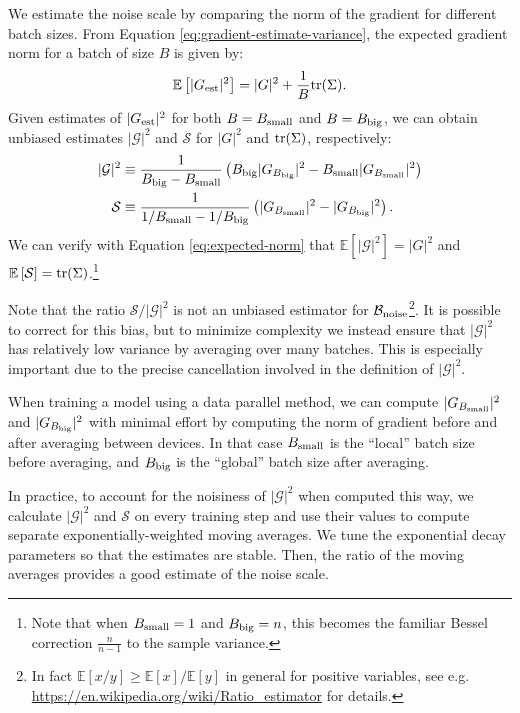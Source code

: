 \documentclass[english]{article}
\begin{document}
We estimate the noise scale by comparing the norm of the gradient for different batch sizes. From Equation \ref{eq:gradient-estimate-variance}, the expected gradient norm for a batch of size $B$ is given by:
\begin{equation}
\mathbb{E}\left[|G_{{\rm est}}|^{2}\right]=|G|^{2}+\frac{1}{B}{\rm tr}(\Sigma).\label{eq:expected-norm}
\end{equation}
Given estimates of $|G_{{\rm est}}|^{2}$ for both $B=B_{{\rm small}}$ and $B=B_{{\rm big}}$, we can obtain unbiased estimates $|\mathcal{G}|^{2}$ and $\mathcal{S}$ for $|G|^{2}$ and ${\rm tr}(\Sigma)$, respectively:
\begin{align}
|\mathcal{G}|^{2} & \equiv\frac{1}{B_{{\rm big}}-B_{{\rm small}}}\left(B_{{\rm big}}|G_{B_{{\rm big}}}|^{2}-B_{{\rm small}}|G_{B_{{\rm small}}}|^{2}\right)\nonumber\\
\mathcal{S} & \equiv\frac{1}{1/B_{{\rm small}}-1/B_{{\rm big}}}\left(|G_{B_{{\rm small}}}|^{2}-|G_{B_{{\rm big}}}|^{2}\right).\label{eq:easy-noise-measurement}
\end{align}
We can verify with Equation \ref{eq:expected-norm} that $\mathbb{E}\left[|\mathcal{G}|^{2}\right]=|G|^{2}$ and $\mathbb{E}\left[\mathcal{S}\right]={\rm tr}(\Sigma)$.\footnote{Note that when $B_{{\rm small}}=1$ and $B_{{\rm big}}=n$, this becomes the familiar Bessel correction $\frac{n}{n-1}$ to the sample variance.}

Note that the ratio $\mathcal{S}/|\mathcal{G}|^{2}$ is not an unbiased estimator for $\mathcal{B}_{{\rm noise}}$\footnote{In fact $\mathbb{E}\left[x/y\right]\geq\mathbb{E}\left[x\right]/\mathbb{E}\left[y\right]$ in general for positive variables, see e.g. \url{https://en.wikipedia.org/wiki/Ratio_estimator} for details.}. It is possible to correct for this bias, but to minimize complexity we instead ensure that $|\mathcal{G}|^{2}$ has relatively low variance by averaging over many batches.  This is especially important due to the precise cancellation involved in the definition of $|\mathcal{G}|^{2}$.

When training a model using a data parallel method, we can compute $|G_{B_{{\rm small}}}|^{2}$ and $|G_{B_{{\rm big}}}|^{2}$ with minimal effort by computing the norm of gradient before and after averaging between devices. In that case $B_{{\rm small}}$ is the ``local'' batch size before averaging, and $B_{{\rm big}}$ is the ``global'' batch size after averaging.

In practice, to account for the noisiness of $|\mathcal{G}|^{2}$ when computed this way, we calculate $|\mathcal{G}|^{2}$ and $\mathcal{S}$ on every training step and use their values to compute separate exponentially-weighted moving averages.  We tune the exponential decay parameters so that the estimates are stable.  Then, the ratio of the moving averages provides a good estimate of the noise scale.
\end{document}
